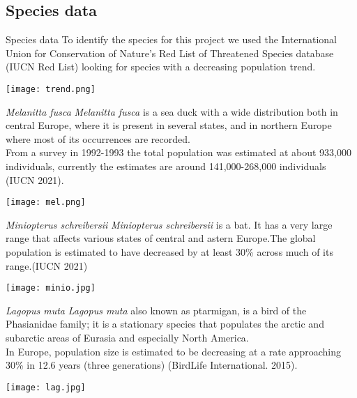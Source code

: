 \documentclass{beamer}
\begin{document}
\subsection{Species data}
\begin{frame}{Species data}
\centering
  To identify the species for this project we used the International Union for Conservation of Nature's Red List of Threatened Species database (IUCN Red List) looking for species with a decreasing population trend.\\
  \bigskip
  
  \centering
  \texttt{[image: trend.png]}
\end{frame}
\begin{frame}{\textit{Melanitta fusca}}
\textit{Melanitta fusca} is a sea duck with a wide distribution both in central Europe, where it is present in several states, and in northern Europe where most of its occurrences are recorded.\\

From a survey in 1992-1993 the total population was estimated at about 933,000 individuals, currently the estimates are around 141,000-268,000 individuals \textcolor{unibo}{(IUCN 2021)}.
\bigskip

\centering
\texttt{[image: mel.png]}
    
\end{frame}
\begin{frame}{\textit{Miniopterus schreibersii}}
    \textit{Miniopterus schreibersii} is a bat. It has a very large range that affects various states of central and astern Europe.The global population is estimated to have decreased by at least 30\% across much of its range.\textcolor{unibo}{(IUCN 2021)}
    
    \centering
    \bigskip
    
    \texttt{[image: minio.jpg]}
\end{frame}
\begin{frame}{\textit{Lagopus muta}}
\textit{Lagopus muta} also known as ptarmigan, is a bird of the Phasianidae family; it is a stationary species that populates the arctic and subarctic areas of Eurasia and especially North America.
\\
In Europe, population size is estimated to be decreasing at a rate approaching 30\% in 12.6 years (three generations) \textcolor{unibo}{(BirdLife International. 2015)}. 

\bigskip

    \centering
    \texttt{[image: lag.jpg]}
\end{frame}
\end{document}
